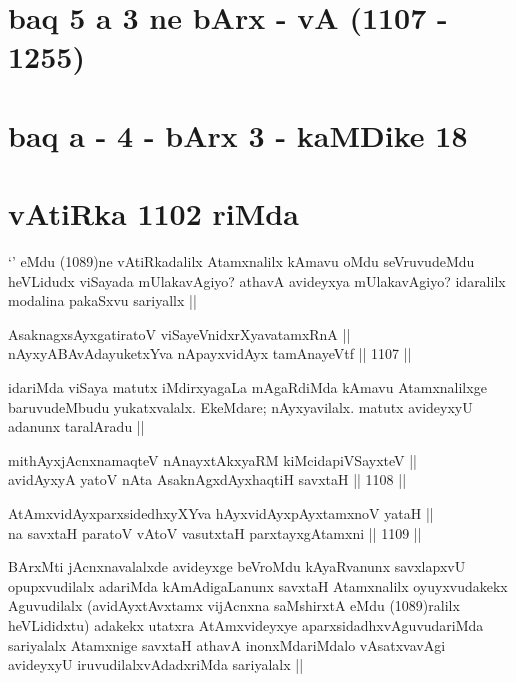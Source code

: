 \section*{baq 5 a 3 ne bArx - vA (1107 - 1255)}

\section*{baq a - 4 - bArx 3 - kaMDike 18}

\section*{vAtiRka 1102 riMda} 

\begin{artha}
`\stext' eMdu (1089)ne vAtiRkadalilx Atamxnalilx kAmavu oMdu seVruvudeMdu heVLidudx viSayada mUlakavAgiyo? athavA avideyxya mUlakavAgiyo? idaralilx modalina pakaSxvu sariyallx ||
\end{artha}

\begin{shl}
AsaknagxsAyx\s \s gatiratoV viSayeVnidxrXyavatamxRnA || \\
nAyxyABAvAdayuketxYva nApayxvidAyx tamAnayeVtf ||  1107 ||  
\end{shl}

\begin{artha}
idariMda viSaya matutx iMdirxyagaLa mAgaRdiMda kAmavu Atamxnalilxge baruvudeMbudu yukatxvalalx. EkeMdare; nAyxyavilalx. matutx avideyxyU adanunx taralAradu ||
\end{artha}


\begin{shl}
mithAyxjAcnxnamaqteV nAnayxtAkxyaRM kiMcidapiVSayxteV ||  \\
avidAyxyA yatoV nAta AsaknAgxdAyxhaqtiH savxtaH ||  1108 ||  
\end{shl}
				
\begin{shl}
AtAmxvidAyxparxsidedhxyXYva hAyxvidAyx\s pAyxtamxnoV yataH || \\
na savxtaH paratoV vA\s toV vasutxtaH parxtayxgAtamxni ||  1109 ||  
\end{shl}

\begin{artha}
BArxMti jAcnxnavalalxde avideyxge beVroMdu kAyaRvanunx savxlapxvU opupxvudilalx adariMda kAmAdigaLanunx savxtaH Atamxnalilx oyuyxvudakekx Aguvudilalx (avidAyxtAvxtamx vijAcnxna saMshirxtA eMdu (1089)ralilx heVLididxtu) adakekx utatxra AtAmxvideyxye aparxsidadhxvAguvudariMda sariyalalx Atamxnige savxtaH athavA inonxMdariMdalo vAsatxvavAgi avideyxyU iruvudilalxvAdadxriMda sariyalalx || 
\end{artha}


